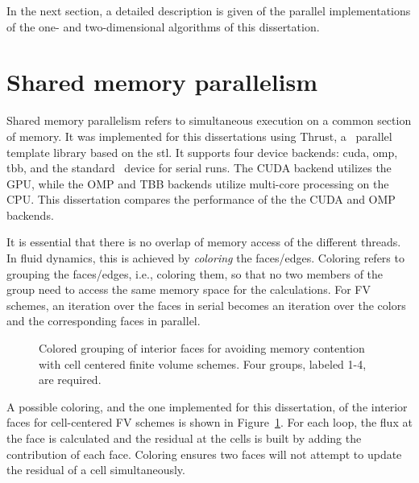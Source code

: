 In the next section, a detailed description is given of the parallel implementations of the one- and two-dimensional algorithms of this dissertation.

\section[Shared memory parallelism]{Shared memory parallelism}
\label{sec:shared_memory}

Shared memory parallelism refers to simultaneous execution on a common section of memory.  It was implemented for this dissertations using Thrust, a \cpp$\,$  parallel template library based on the \gls{stl}.  It supports four device backends: \gls{cuda}, \gls{omp}, \gls{tbb}, and the standard \cpp$\,$  device for serial runs.  The CUDA backend utilizes the GPU, while the OMP and TBB backends utilize multi-core processing on the CPU.  This dissertation compares the performance of the the CUDA and OMP backends.

It is essential that there is no overlap of memory access of the different threads.  In fluid dynamics, this is achieved by \emph{coloring} the faces/edges.  Coloring refers to grouping the faces/edges, i.e., coloring them, so that no two members of the group need to access the same memory space for the calculations.  For FV schemes, an iteration over the faces in serial becomes an iteration over the colors and the corresponding faces in parallel. 

\begin{figure}[htbp]\figSpace
\begin{center}

\end{center}
\caption{Colored grouping of interior faces for avoiding memory contention with cell centered finite volume schemes.  Four groups, labeled 1-4, are required.}
\label{fig:face_color_1}
\figSpace
\end{figure}

A possible coloring, and the one implemented for this dissertation, of the interior faces for cell-centered FV schemes is shown in Figure~\ref{fig:face_color_1}.  For each loop, the flux at the face is calculated and the residual at the cells is built by adding the contribution of each face.  Coloring ensures two faces will not attempt to update the residual of a cell simultaneously.

